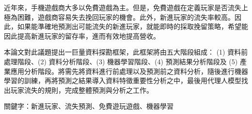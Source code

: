 
近年來，手機遊戲商大多以免費遊戲為主。但是，免費遊戲在定義玩家是否流失上極為困難，遊戲商容易失去挽回玩家的機會。此外，新進玩家的流失率較高。因此，如果能準確地預測出可能流失的新進玩家，就能即時的採取挽留策略，希望能因此提高新進玩家的留存率，進而有效地提高營收。

本論文對此議題提出一巨量資料探勘框架，此框架將由五大階段組成： (1) 資料前處理階段、(2) 資料分析階段、(3) 機器學習階段、(4) 預測結果分析階段及 (5) 產業應用分析階段。將需先將資料進行前處理以及預測前之資料分析，隨後進行機器學習的訓練，再將預測之結果導入資料特徵重要性分析之中，最後用代理人模型找出玩家流失的規則，完成整體預測與分析之工作。

關鍵字：新進玩家、流失預測、免費遊玩遊戲、機器學習
